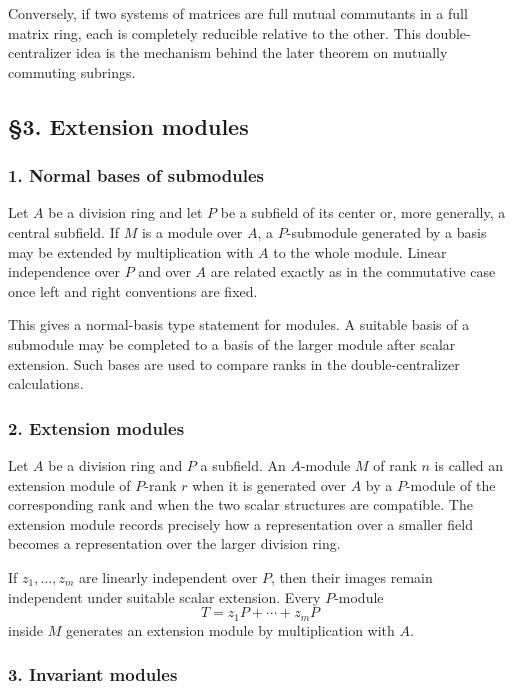 \documentclass[
  11pt,
]{article}
\begin{document}
Conversely, if two systems of matrices are full mutual commutants in a
full matrix ring, each is completely reducible relative to the other.
This double-centralizer idea is the mechanism behind the later theorem
on mutually commuting subrings.

\subsection{§3. Extension modules}\label{extension-modules}

\subsubsection{1. Normal bases of
submodules}\label{normal-bases-of-submodules}

Let \(A\) be a division ring and let \(P\) be a subfield of its center
or, more generally, a central subfield. If \(M\) is a module over \(A\),
a \(P\)-submodule generated by a basis may be extended by multiplication
with \(A\) to the whole module. Linear independence over \(P\) and over
\(A\) are related exactly as in the commutative case once left and right
conventions are fixed.

This gives a normal-basis type statement for modules. A suitable basis
of a submodule may be completed to a basis of the larger module after
scalar extension. Such bases are used to compare ranks in the
double-centralizer calculations.

\subsubsection{2. Extension modules}\label{extension-modules-1}

Let \(A\) be a division ring and \(P\) a subfield. An \(A\)-module \(M\)
of rank \(n\) is called an extension module of \(P\)-rank \(r\) when it
is generated over \(A\) by a \(P\)-module of the corresponding rank and
when the two scalar structures are compatible. The extension module
records precisely how a representation over a smaller field becomes a
representation over the larger division ring.

If \(z_1,
\ldots,z_m\) are linearly independent over \(P\), then their images
remain independent under suitable scalar extension. Every \(P\)-module
\[
  T=z_1P+
\cdots+z_mP
\] inside \(M\) generates an extension module by multiplication with
\(A\).

\subsubsection{3. Invariant modules}\label{invariant-modules}
\end{document}
